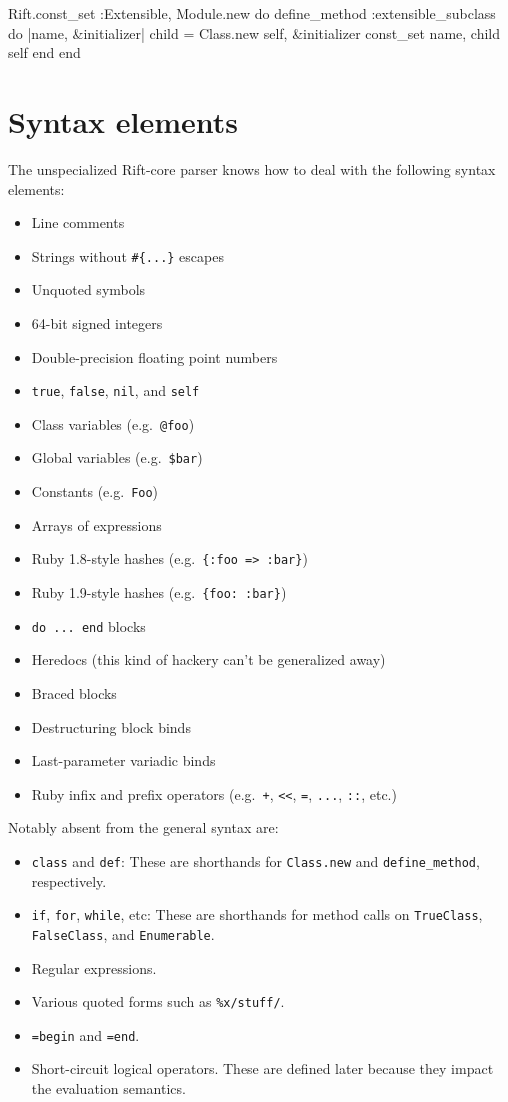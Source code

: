 \documentclass{report}
\begin{document}
\begin{rubycode}
Rift.const_set :Extensible, Module.new do
  define_method :extensible_subclass do |name, &initializer|
    child = Class.new self, &initializer
    const_set name, child
    self
  end
end \end{rubycode}

\section{Syntax elements}
    The unspecialized Rift-core parser knows how to deal with the following syntax elements:

\begin{itemize}
\item{Line comments}
\item{Strings without {\tt \#\{...\}} escapes}
\item{Unquoted symbols}
\item{64-bit signed integers}
\item{Double-precision floating point numbers}
\item{{\tt true}, {\tt false}, {\tt nil}, and {\tt self}}
\item{Class variables (e.g.~{\tt @foo})}
\item{Global variables (e.g.~{\tt \$bar})}
\item{Constants (e.g.~{\tt Foo})}
\item{Arrays of expressions}
\item{Ruby 1.8-style hashes (e.g.~{\tt \{:foo => :bar\}})}
\item{Ruby 1.9-style hashes (e.g.~{\tt \{foo:~:bar\}})}
\item{{\tt do ... end} blocks}
\item{Heredocs (this kind of hackery can't be generalized away)}
\item{Braced blocks}
\item{Destructuring block binds}
\item{Last-parameter variadic binds}
\item{Ruby infix and prefix operators (e.g.~{\tt +}, {\tt <<}, {\tt =}, {\tt ...}, {\tt ::}, etc.)}
\end{itemize}

    Notably absent from the general syntax are:

\begin{itemize}
\item{{\tt class} and {\tt def}: These are shorthands for {\tt Class.new} and {\tt define\_method}, respectively.}
\item{{\tt if}, {\tt for}, {\tt while}, etc: These are shorthands for method calls on {\tt TrueClass}, {\tt FalseClass}, and {\tt Enumerable}.}
\item{Regular expressions.}
\item{Various quoted forms such as {\tt \%x/stuff/}.}
\item{{\tt =begin} and {\tt =end}.}
\item{Short-circuit logical operators. These are defined later because they impact the evaluation semantics.}
\end{itemize}
\end{document}
